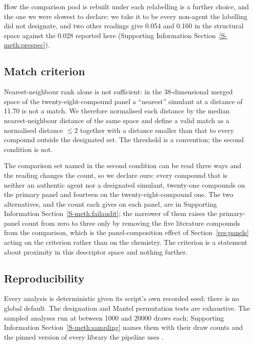 \documentclass[journal=ancham,manuscript=article,margin=1in]{achemso}
\begin{document}
How the comparison pool is rebuilt under each relabelling is a further choice,
and the one we were slowest to declare: we take it to be every non-agent the
labelling did not designate, and two other readings give 0.054 and 0.160 in the
structural space against the 0.028 reported here (Supporting Information
Section~\ref{S-meth:prespec}).

\subsection{Match criterion}
\label{meth:match}
Nearest-neighbour rank alone is not sufficient: in the 38-dimensional merged
space of the twenty-eight-compound panel a ``nearest'' simulant at a distance of
11.70 is not a match. We therefore normalised each distance by the median
nearest-neighbour distance of the same space and define a valid match as a
normalised distance $\le 2$ together with a distance smaller than that to every
compound outside the designated set. The threshold is a convention; the second
condition is not.

The comparison set named in the second condition can be read three ways and the
reading changes the count, so we declare ours: every compound that is neither an
authentic agent nor a designated simulant, twenty-one compounds on the primary
panel and fourteen on the twenty-eight-compound one. The two alternatives, and
the count each gives on each panel, are in Supporting Information
Section~\ref{S-meth:failaudit}; the narrower of them raises the primary-panel
count from zero to three only by removing the five literature compounds from the
comparison, which is the panel-composition effect of Section~\ref{res:panels}
acting on the criterion rather than on the chemistry. The criterion is a
statement about proximity in this descriptor space and nothing further.

\subsection{Reproducibility}
\label{res:repro}
Every analysis is deterministic given its script's own recorded seed; there is
no global default. The designation and Mantel permutation tests are
exhaustive. The sampled analyses run at between
1000 and 20000 draws each; Supporting Information
Section~\ref{S-meth:sampling} names them with their draw counts and the pinned
version of every library the pipeline uses
\cite{numpy2020,scipy2020,mckinney2010,matplotlib2007,rdkit,pyscf2020}.
\end{document}
